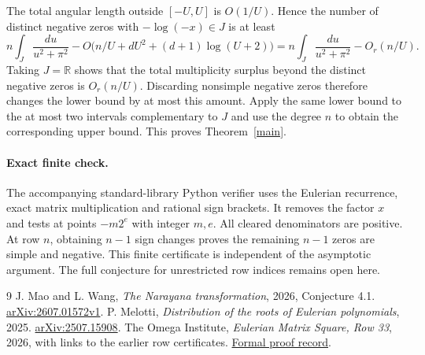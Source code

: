 \documentclass[11pt]{article}
\begin{document}
The total angular length outside $[-U,U]$ is $O(1/U)$. Hence the number of distinct negative zeros with $-\log(-x)\in J$ is at least
\[
 n\int_J\frac{du}{u^2+\pi^2}
 -O\big(n/U+dU^2+(d+1)\log(U+2)\big)
 =n\int_J\frac{du}{u^2+\pi^2}-O_r(n/U).
\]
Taking $J=\mathbb R$ shows that the total multiplicity surplus beyond the distinct negative zeros is $O_r(n/U)$. Discarding nonsimple negative zeros therefore changes the lower bound by at most this amount. Apply the same lower bound to the at most two intervals complementary to $J$ and use the degree $n$ to obtain the corresponding upper bound. This proves Theorem~\ref{main}.

\paragraph{Exact finite check.} The accompanying standard-library Python verifier uses the Eulerian recurrence, exact matrix multiplication and rational sign brackets. It removes the factor $x$ and tests at points $-m2^e$ with integer $m,e$. All cleared denominators are positive. At row $n$, obtaining $n-1$ sign changes proves the remaining $n-1$ zeros are simple and negative. This finite certificate is independent of the asymptotic argument. The full conjecture for unrestricted row indices remains open here.

\begin{thebibliography}{9}
 J. Mao and L. Wang, \emph{The Narayana transformation}, 2026, Conjecture 4.1. \href{https://arxiv.org/abs/2607.01572v1}{arXiv:2607.01572v1}.
 P. Melotti, \emph{Distribution of the roots of Eulerian polynomials}, 2025. \href{https://arxiv.org/abs/2507.15908}{arXiv:2507.15908}.
 The Omega Institute, \emph{Eulerian Matrix Square, Row 33}, 2026, with links to the earlier row certificates. \href{https://www.trureturing.org/knowledge/node/4c8d23f92b2193daa1cb796b24022eb3b71548e0ee51ea5323ac87c69dad6058/}{Formal proof record}.
\end{thebibliography}
\end{document}
